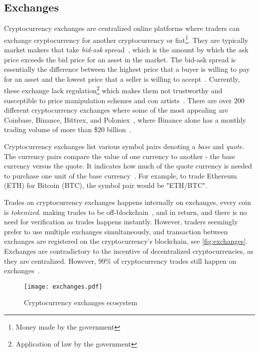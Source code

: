 \subsection{Exchanges}\label{sec:exchanges}
Cryptocurrency exchanges are centralized online platforms where traders can exchange cryptocurrency for another cryptocurrency or fiat\footnote{Money made by the government\cite{fiat}}. They are typically market makers that take \emph{bid-ask} spread~\cite{norton_rose}, which is the amount by which the ask price exceeds the bid price for an asset in the market. The bid-ask spread is essentially the difference between the highest price that a buyer is willing to pay for an asset and the lowest price that a seller is willing to accept~\cite{bidask}. Currently, these exchange lack regulation\footnote{Application of law by the government} which makes them not trustworthy and susceptible to price manipulation schemes and con artists~\cite{exchange_scammers, exchange_scammers_2}. There are over $200$ different cryptocurrency exchanges where some of the most appealing are Coinbase, Binance, Bittrex, and Poloniex~\cite{exchange_best_1, exchange_best_2}, where Binance alone has a monthly trading volume of more than \$$20$ billion~\cite{coinmarketcap_exchange}.

Cryptocurrency exchanges list various symbol pairs denoting a \emph{base} and \emph{quote}. The currency pairs compare the value of one currency to another - the base currency versus the quote. It indicates how much of the quote currency is needed to purchase one unit of the base currency~\cite{investopedia_cryptocurrency}. For example, to trade Ethereum (ETH) for Bitcoin (BTC), the symbol pair would be "ETH/BTC".

Trades on cryptocurrency exchanges happens internally on exchanges, every coin is \emph{tokenized}. making trades to be off-blockchain~\cite{exchange_off_chain}, and in return, and there is no need for verification as trades happens instantly. However, traders seemingly prefer to use multiple exchanges simultaneously, and transaction between exchanges are registered on the cryptocurrency's blockchain, see \autoref{fig:exchanges}. Exchanges are contradictory to the incentive of decentralized cryptocurrencies, as they are centralized. However, $99\%$ of cryptocurrency trades still happen on exchanges~\cite{coinsutra}.

\begin{figure}[ht]
    \centering
    \texttt{[image: exchanges.pdf]}
    \caption[Ecosystem of cryptocurrencies and exchanges]{Cryptocurrency exchanges ecosystem}
\label{fig:exchanges}
\end{figure}

